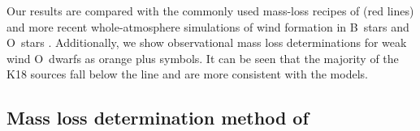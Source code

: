 \documentclass[useAMS, usenatbib, a4paper]{mnras}
\begin{document}
Our results are compared with the commonly used mass-loss recipes of
\citet{Vink:2000a} (red lines) and more recent whole-atmosphere
simulations of wind formation in B~stars \citep{Krticka:2014a} and
O~stars \citep{Krticka:2017a}.  Additionally, we show observational
mass loss determinations for weak wind O~dwarfs
\citep{Marcolino:2009a} as orange plus symbols.  It can be seen that
the majority of the K18 sources fall below the \citeauthor{Vink:2000a}
line and are more consistent with the \citet{Krticka:2017a} models.

\subsection{Mass loss determination method of \protect\citet{Kobulnicky:2018a}}
\label{app:bow-shock-data}




\end{document}
